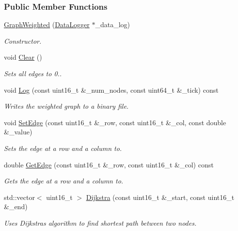 \subsubsection*{Public Member Functions}
\begin{DoxyCompactItemize}
\item 
\hyperlink{classosse_1_1collaborate_1_1_graph_weighted_a983e8d0efd6bba488b979b546cb078ff}{Graph\+Weighted} (\hyperlink{classosse_1_1collaborate_1_1_data_logger}{Data\+Logger} $\ast$\+\_\+data\+\_\+log)
\begin{DoxyCompactList}\small\item\em Constructor. \end{DoxyCompactList}\item 
\mbox{\label{classosse_1_1collaborate_1_1_graph_weighted_a485197f02e24b37e2e2e47136548aa3d}} 
void \hyperlink{classosse_1_1collaborate_1_1_graph_weighted_a485197f02e24b37e2e2e47136548aa3d}{Clear} ()
\begin{DoxyCompactList}\small\item\em Sets all edges to 0.. \end{DoxyCompactList}\item 
void \hyperlink{classosse_1_1collaborate_1_1_graph_weighted_ab55668685b7bde8d3553cedeb95efab3}{Log} (const uint16\+\_\+t \&\+\_\+num\+\_\+nodes, const uint64\+\_\+t \&\+\_\+tick) const
\begin{DoxyCompactList}\small\item\em Writes the weighted graph to a binary file. \end{DoxyCompactList}\item 
void \hyperlink{classosse_1_1collaborate_1_1_graph_weighted_a20ad6c253cec6b39d5d2cee4aa5ea073}{Set\+Edge} (const uint16\+\_\+t \&\+\_\+row, const uint16\+\_\+t \&\+\_\+col, const double \&\+\_\+value)
\begin{DoxyCompactList}\small\item\em Sets the edge at a row and a column to. \end{DoxyCompactList}\item 
double \hyperlink{classosse_1_1collaborate_1_1_graph_weighted_a10d1d7bb90d63fa8461e044ca5b2bd20}{Get\+Edge} (const uint16\+\_\+t \&\+\_\+row, const uint16\+\_\+t \&\+\_\+col) const
\begin{DoxyCompactList}\small\item\em Gets the edge at a row and a column to. \end{DoxyCompactList}\item 
std\+::vector$<$ uint16\+\_\+t $>$ \hyperlink{classosse_1_1collaborate_1_1_graph_weighted_a657a68399222496d6664418061fe2108}{Dijkstra} (const uint16\+\_\+t \&\+\_\+start, const uint16\+\_\+t \&\+\_\+end)
\begin{DoxyCompactList}\small\item\em Uses Dijkstra\textquotesingle{}s algorithm to find shortest path between two nodes. \end{DoxyCompactList}\end{DoxyCompactItemize}
